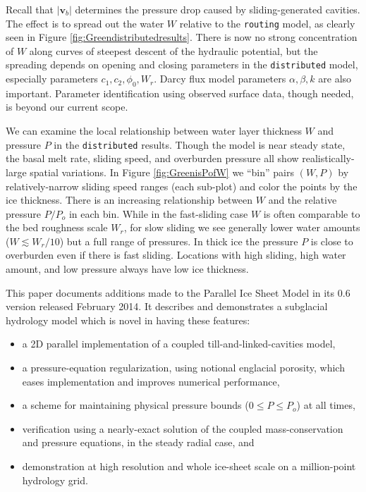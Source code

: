 \documentclass[gmd]{copernicus}   %
\newcommand\bv{\mathbf{v}}
\begin{document}
Recall that $|\bv_b|$ determines the pressure drop caused by sliding-generated cavities.  The effect is to spread out the water $W$ relative to the \texttt{routing} model, as clearly seen in Figure \ref{fig:Greendistributedresults}.  There is now no strong concentration of $W$ along curves of steepest descent of the hydraulic potential, but the spreading depends on opening and closing parameters in the \texttt{distributed} model, especially parameters $c_1,c_2,\phi_0,W_r$.  Darcy flux model parameters $\alpha,\beta,k$ are also important.  Parameter identification using observed surface data, though needed, is beyond our current scope.

We can examine the local relationship between water layer thickness $W$ and pressure $P$ in the \texttt{distributed} results.  Though the model is near steady state, the basal melt rate, sliding speed, and overburden pressure all show realistically-large spatial variations.  In Figure \ref{fig:GreenisPofW} we ``bin'' pairs $(W,P)$ by relatively-narrow sliding speed ranges (each sub-plot) and color the points by the ice thickness.  There is an increasing relationship between $W$ and the relative pressure $P/P_o$ in each bin.  While in the fast-sliding case $W$ is often comparable to the bed roughness scale $W_r$, for slow sliding we see generally lower water amounts ($W \lesssim W_r/10$) but a full range of pressures.  In thick ice the pressure $P$ is close to overburden even if there is fast sliding.  Locations with high sliding, high water amount, and low pressure always have low ice thickness.

\conclusions  \label{sec:conclusion}  This paper documents additions made to the Parallel Ice Sheet Model in its 0.6 version released February 2014.  It describes and demonstrates a subglacial hydrology model which is novel in having these features:\begin{itemize}
\item a 2D parallel implementation of a coupled till-and-linked-cavities model,
\item a pressure-equation regularization, using notional englacial porosity, which eases implementation and improves numerical performance,
\item a scheme for maintaining physical pressure bounds ($0\le P \le P_o$) at all times,
\item verification using a nearly-exact solution of the coupled mass-conservation and pressure equations, in the steady radial case, and
\item demonstration at high resolution and whole ice-sheet scale on a million-point hydrology grid.
\end{itemize}
\end{document}
